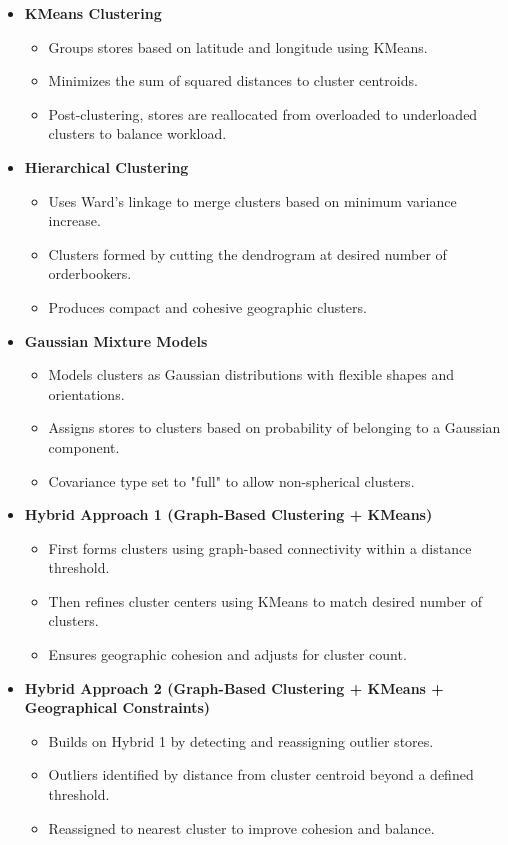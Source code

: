 \begin{itemize}
    \item \textbf{KMeans Clustering}
    \begin{itemize}
        \item Groups stores based on latitude and longitude using KMeans.
        \item Minimizes the sum of squared distances to cluster centroids.
        \item Post-clustering, stores are reallocated from overloaded to underloaded clusters to balance workload.
    \end{itemize}
    
    \item \textbf{Hierarchical Clustering}
    \begin{itemize}
        \item Uses Ward's linkage to merge clusters based on minimum variance increase.
        \item Clusters formed by cutting the dendrogram at desired number of orderbookers.
        \item Produces compact and cohesive geographic clusters.
    \end{itemize}
    
    \item \textbf{Gaussian Mixture Models}
    \begin{itemize}
        \item Models clusters as Gaussian distributions with flexible shapes and orientations.
        \item Assigns stores to clusters based on probability of belonging to a Gaussian component.
        \item Covariance type set to "full" to allow non-spherical clusters.
    \end{itemize}

    \item \textbf{Hybrid Approach 1 (Graph-Based Clustering + KMeans)}
    \begin{itemize}
        \item First forms clusters using graph-based connectivity within a distance threshold.
        \item Then refines cluster centers using KMeans to match desired number of clusters.
        \item Ensures geographic cohesion and adjusts for cluster count.
    \end{itemize}

    \item \textbf{Hybrid Approach 2 (Graph-Based Clustering + KMeans + Geographical Constraints)}
    \begin{itemize}
        \item Builds on Hybrid 1 by detecting and reassigning outlier stores.
        \item Outliers identified by distance from cluster centroid beyond a defined threshold.
        \item Reassigned to nearest cluster to improve cohesion and balance.
    \end{itemize}
\end{itemize}

